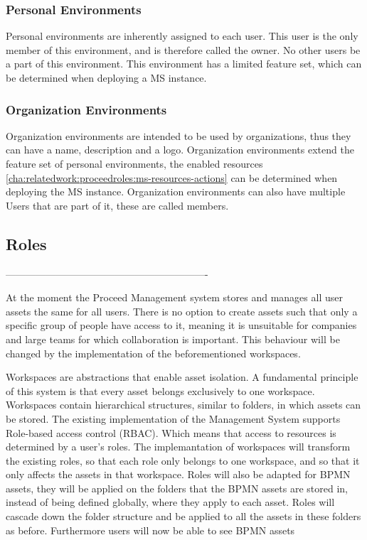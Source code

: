 \subsubsection{Personal Environments}
\label{cha:conceptanddesign:environments:personal}

Personal environments are inherently assigned to each user. 
This user is the only member of this environment, and is therefore called the owner.
No other users be a part of this environment.
This environment has a limited feature set, which can be determined when deploying a MS
instance.

\subsubsection{Organization Environments}
\label{cha:conceptanddesign:environments:organization}

Organization environments are intended to be used by organizations, thus they can have a
name, description and a logo.
Organization environments extend the feature set of personal environments, the enabled
resources \ref{cha:relatedwork:proceedroles:ms-resources-actions} can be determined when
deploying the MS instance.
Organization environments can also have multiple Users that are part of it, these are
called members.

\subsection{Roles}




-------------------------------------------------------------



At the moment the Proceed Management system stores and manages all user assets the same for all users.
There is no option to create assets such that only a specific group of people have access to it, meaning it is unsuitable for companies and large teams for which collaboration is important.
This behaviour will be changed by the implementation of the beforementioned workspaces.

Workspaces are abstractions that enable asset isolation.
A fundamental principle of this system is that every asset belongs exclusively to one workspace.
Workspaces contain hierarchical structures, similar to folders, in which assets can be stored.
The existing implementation of the Management System supports Role-based access control (RBAC).
Which means that access to resources is determined by a user's roles.
The implemantation of workspaces will transform the existing roles, so that each role only belongs to one workspace, and so that it only affects the assets in that workspace.
Roles will also be adapted for BPMN assets, they will be applied on the folders that the BPMN assets are stored in, instead of being defined globally, where they apply to each asset.
Roles will cascade down the folder structure and be applied to all the assets in these folders as before.
Furthermore users will now be able to see BPMN assets 

